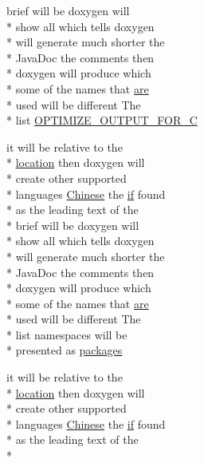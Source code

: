 \begin{DoxyCompactItemize}
brief will be doxygen will \\*
show all which tells doxygen \\*
will generate much shorter the \\*
Java\-Doc the comments then \\*
doxygen will produce which \\*
some of the names that \hyperlink{sdlgamepad_8dox_a6d0965b20c4eb2235e8f9f5f0e5193ae}{are} \\*
used will be different The \\*
list \hyperlink{sdlgamepad_8dox_aa542a8f1572d888d9ecd0f903a299444}{O\-P\-T\-I\-M\-I\-Z\-E\-\_\-\-O\-U\-T\-P\-U\-T\-\_\-\-F\-O\-R\-\_\-\-C}
\item 
it will be relative to the \\*
\hyperlink{glext_8h_a6f0165ed903f22b8bb600c3e0b628e73}{location} then doxygen will \\*
create other supported \\*
languages \hyperlink{sdlgamepad_8dox_ab6ff97d2e5e9fa61c208d5f0eee91c62}{Chinese} the \hyperlink{qxtdiscoverableservice_8cpp_aa620047247d7e2a6894ad8ad666771de}{if} found \\*
as the leading text of the \\*
brief will be doxygen will \\*
show all which tells doxygen \\*
will generate much shorter the \\*
Java\-Doc the comments then \\*
doxygen will produce which \\*
some of the names that \hyperlink{sdlgamepad_8dox_a6d0965b20c4eb2235e8f9f5f0e5193ae}{are} \\*
used will be different The \\*
list namespaces will be \\*
presented as \hyperlink{sdlgamepad_8dox_a299b82abc5d35aed83d60f05c2cb228c}{packages}
\item 
it will be relative to the \\*
\hyperlink{glext_8h_a6f0165ed903f22b8bb600c3e0b628e73}{location} then doxygen will \\*
create other supported \\*
languages \hyperlink{sdlgamepad_8dox_ab6ff97d2e5e9fa61c208d5f0eee91c62}{Chinese} the \hyperlink{qxtdiscoverableservice_8cpp_aa620047247d7e2a6894ad8ad666771de}{if} found \\*
as the leading text of the \\*

\end{DoxyCompactItemize}

